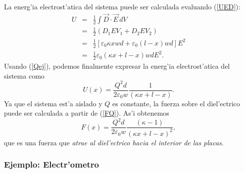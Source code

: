 La energ'ia electrost'atica del sistema puede ser calculada evaluando
(\ref{UED}):
\begin{eqnarray}
 U&=&\frac{1}{2}\int\vec{D}\cdot\vec{E}\,dV \\
&=&\frac{1}{2}\left(D_1EV_1+D_2EV_2\right) \\
&=&\frac{1}{2}\left[\varepsilon_0\kappa
xwd+\varepsilon_0(l-x)wd\right]E^2 \\
&=&\frac{1}{2}\varepsilon_0\left(\kappa x+l-x\right)wdE^2 .
\end{eqnarray}
Usando (\ref{Qej}), podemos finalmente expresar la energ'ia electrost'atica
del sistema como
\begin{equation}
U(x)=\frac{Q^2d}{2\varepsilon_0 w}\frac{1}{(\kappa x+l-x)}.
\end{equation}
Ya que el sistema est'a aislado y $Q$ es constante, la fuerza sobre el
diel'ectrico puede ser calculada a partir de (\ref{FQ}). As'i obtenemos
\begin{equation}
 F(x)=\frac{Q^2d}{2\varepsilon_0 w}\frac{(\kappa-1)}{(\kappa x+l-x)^2},
\end{equation}
que es una fuerza que \textit{atrae al diel'ectrico hacia el interior de las
placas}.

\subsubsection{Ejemplo: Electr'ometro}